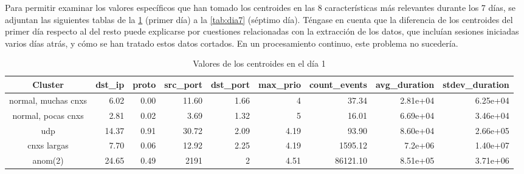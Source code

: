 Para permitir examinar los valores específicos que han tomado los centroides en las 8 características más relevantes durante los 7 días, se adjuntan las siguientes tablas de la \ref{tab:dia1} (primer día) a la \ref{tab:dia7} (séptimo día).
Téngase en cuenta que la diferencia de los centroides del primer día respecto al del resto puede explicarse por cuestiones relacionadas con la extracción de los datos,
que incluían sesiones iniciadas varios días atrás, y cómo se han tratado estos datos cortados.
En un procesamiento continuo, este problema no sucedería.

\begin{table}[h]
    \begingroup
    \setlength{\tabcolsep}{2pt} %
    \hspace*{-3cm}
    \begin{tabular}{|c|r|r|r|r|r|r|r|r|}
    \hline
    \textbf{Cluster}    & \textbf{dst\_ip} & \textbf{proto} & \textbf{src\_port} & \textbf{dst\_port} & \textbf{max\_prio} & \textbf{count\_events} & \textbf{avg\_duration} & \textbf{stdev\_duration} \\ \hline
    normal, muchas cnxs & 6.02             & 0.00           & 11.60              & 1.66               & 4                  & 37.34                  & 2.81e+04               & 6.25e+04                 \\ \hline
    normal, pocas cnxs  & 2.81             & 0.02           & 3.69               & 1.32               & 5                  & 16.01                  & 6.69e+04               & 3.46e+04                 \\ \hline
    udp                 & 14.37            & 0.91           & 30.72              & 2.09               & 4.19               & 93.90                  & 8.60e+04               & 2.66e+05                 \\ \hline
    cnxs largas         & 7.70             & 0.06           & 12.92              & 2.25               & 4.19               & 1595.12                & 7.2e+06                & 1.40e+07                 \\ \hline
    anom(2)             & 24.65            & 0.49           & 2191               & 2                  & 4.51               & 86121.10               & 8.51e+05               & 3.71e+06                 \\ \hline
    \end{tabular}
    \endgroup
\caption{Valores de los centroides en el día 1}
\label{tab:dia1}
\end{table}

